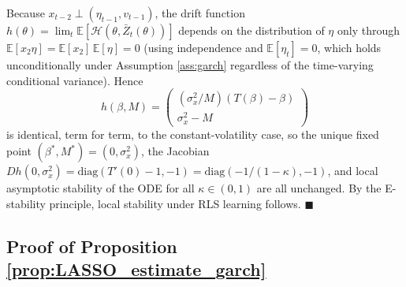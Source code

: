 Because $x_{t-2}\perp(\eta_{t-1},v_{t-1})$, the drift function
$h(\theta)=\lim_t \mathbb E[\mathcal H(\theta,\bar Z_t(\theta))]$ depends on the distribution of $\eta$
only through $\mathbb E[x_2\eta]=\mathbb E[x_2]\,\mathbb E[\eta]=0$ (using independence and
$\mathbb E[\eta_t]=0$, which holds unconditionally under Assumption \ref{ass:garch} regardless of the
time-varying conditional variance). Hence
\[
h(\beta,M) = \begin{pmatrix}(\sigma_x^2/M)(T(\beta)-\beta)\\ \sigma_x^2 - M\end{pmatrix}
\]
is identical, term for term, to the constant-volatility case, so the unique fixed point
$(\beta^*,M^*)=(0,\sigma_x^2)$, the Jacobian
$Dh(0,\sigma_x^2)=\mathrm{diag}(T'(0)-1,-1)=\mathrm{diag}(-1/(1-\kappa),-1)$, and local asymptotic
stability of the ODE for all $\kappa\in(0,1)$ are all unchanged. By the E-stability principle, local
stability under RLS learning follows. $\blacksquare$

\subsection{Proof of Proposition \ref{prop:LASSO_estimate_garch}}\label{app:proof_LASSO_garch}

